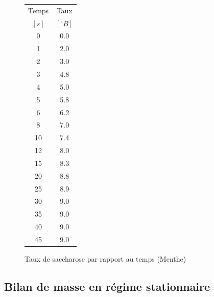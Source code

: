 \documentclass[a4paper,11pt]{article}
\begin{document}
\begin{figure}[h!]
	\begin{minipage}[m]{.3\textwidth}
		\centering\begin{footnotesize}
		\begin{tabular}{|c|c|}\hline\rowcolor{Gray}
			Temps & Taux \\ \rowcolor{Gray}
			$[s]$ & $[^\circ B]$ \\ \hline
			0 & 0.0 \\
			1 & 2.0 \\
			2 & 3.0 \\
			3 & 4.8 \\
			4 & 5.0 \\
			5 & 5.8 \\
			6 & 6.2 \\
			8 & 7.0 \\
			10 & 7.4 \\
			12 & 8.0 \\
			15 & 8.3 \\
			20 & 8.8 \\
			25 & 8.9 \\
			30 & 9.0 \\
			35 & 9.0 \\
			40 & 9.0 \\
			45 & 9.0 \\ \hline
		\end{tabular}\end{footnotesize}
	\end{minipage}
	\begin{minipage}[m]{.5\textwidth}
		\centering
	\end{minipage}
	\caption{Taux de saccharose par rapport au temps (Menthe) \label{menth}}
\end{figure}

\subsection{Bilan de masse en régime stationnaire}
\end{document}
